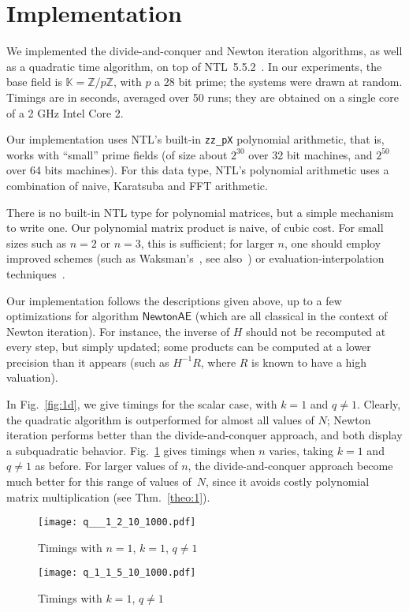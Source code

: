 \documentclass[]{sig-alternate}
\def\NewtonAE{\mathsf{NewtonAE}}
\def\K {\ensuremath{\mathbb{K}}}
\begin{document}
\section{Implementation}

We implemented the divide-and-conquer and Newton iteration algorithms,
as well as a quadratic time algorithm, on top of
NTL~5.5.2~\cite{NTL}. In our experiments, the base field is
$\K=\mathbb{Z}/p \mathbb{Z}$, with $p$ a 28 bit prime; the systems
were drawn at random. Timings are in seconds, averaged over 50 runs;
they are obtained on a single core of a 2 GHz Intel Core 2.


Our implementation uses NTL's built-in \texttt{zz\_pX} polynomial
arithmetic, that is, works with ``small'' prime fields (of size about
$2^{30}$ over 32 bit machines, and $2^{50}$ over 64 bits machines).
For this data type, NTL's polynomial arithmetic uses a combination of
naive, Karatsuba and FFT arithmetic.

There is no built-in NTL type for polynomial matrices, but a simple
mechanism to write one. Our polynomial matrix product is naive, of
cubic cost. For small sizes such as $n=2$ or $n=3$, this is
sufficient; for larger $n$, one should employ improved schemes (such
as Waksman's~\cite{Waksman70}, see also~\cite{DrIsSc11}) or
evaluation-interpolation techniques~\cite{BoSc05}.

Our implementation follows the descriptions given above, up to a few
optimizations for algorithm $\NewtonAE$ (which are all classical
in the context of Newton iteration). For instance, the inverse of
$H$ should not be recomputed at every step, but simply updated; some
products can be computed at a lower precision than it appears (such as
$H^{-1} R$, where $R$ is known to have a high valuation).


In Fig.~\ref{fig:1d}, we give timings for the scalar case, with $k=1$
and $q \ne 1$. Clearly, the quadratic algorithm is outperformed for
almost all values of $N$; Newton iteration performs better than the
divide-and-conquer approach, and both display a subquadratic behavior.
Fig.~\ref{fig:2d} gives timings when $n$ varies, taking $k=1$ and
$q\neq 1$ as before. For larger values of $n$, the divide-and-conquer
approach become much better for this range of values of~$N$, since it
avoids costly polynomial matrix multiplication (see
Thm.~\ref{theo:1}).

\begin{figure}[t]
\centerline{\texttt{[image: q\_\_\_1\_2\_10\_1000.pdf]}}
\vspace{-0.5cm}
\caption{Timings with $n=1$, $k=1$, $q \ne 1$}
\label{fig:1d}
\centerline{\texttt{[image: q\_1\_1\_5\_10\_1000.pdf]}}
\vspace{-1cm}
\caption{Timings with $k=1$, $q \ne 1$}
\label{fig:2d}
\end{figure}
\end{document}
